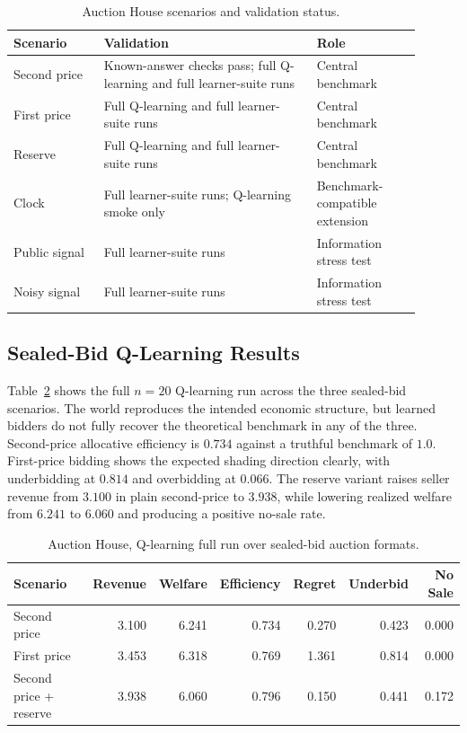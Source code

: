 \documentclass[11pt]{article}
\begin{document}
\begin{table}[h]
\centering
\begin{tabular}{p{0.20\linewidth}p{0.47\linewidth}p{0.23\linewidth}}
\toprule
Scenario & Validation & Role \\
\midrule
Second price & Known-answer checks pass; full Q-learning and full learner-suite runs & Central benchmark \\
First price & Full Q-learning and full learner-suite runs & Central benchmark \\
Reserve & Full Q-learning and full learner-suite runs & Central benchmark \\
Clock & Full learner-suite runs; Q-learning smoke only & Benchmark-compatible extension \\
Public signal & Full learner-suite runs & Information stress test \\
Noisy signal & Full learner-suite runs & Information stress test \\
\bottomrule
\end{tabular}
\caption{Auction House scenarios and validation status.}
\label{tab:auction-status}
\end{table}

\subsection{Sealed-Bid Q-Learning Results}

Table~\ref{tab:auction-qlearning} shows the full \(n=20\) Q-learning run across
the three sealed-bid scenarios. The world reproduces the intended economic
structure, but learned bidders do not fully recover the theoretical benchmark
in any of the three. Second-price allocative efficiency is \(0.734\) against a
truthful benchmark of \(1.0\). First-price bidding shows the expected shading
direction clearly, with underbidding at \(0.814\) and overbidding at \(0.066\).
The reserve variant raises seller revenue from \(3.100\) in plain second-price
to \(3.938\), while lowering realized welfare from \(6.241\) to \(6.060\) and
producing a positive no-sale rate.

\begin{table}[h]
\centering
\begin{tabular}{lrrrrrr}
\toprule
Scenario & Revenue & Welfare & Efficiency & Regret & Underbid & No Sale \\
\midrule
Second price & 3.100 & 6.241 & 0.734 & 0.270 & 0.423 & 0.000 \\
First price & 3.453 & 6.318 & 0.769 & 1.361 & 0.814 & 0.000 \\
Second price + reserve & 3.938 & 6.060 & 0.796 & 0.150 & 0.441 & 0.172 \\
\bottomrule
\end{tabular}
\caption{Auction House, Q-learning full run over sealed-bid auction formats.}
\label{tab:auction-qlearning}
\end{table}
\end{document}
